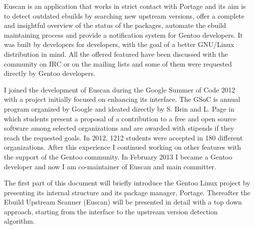 Euscan is an application that works in strict contact with Portage and its aim is to detect outdated ebuilds by searching new upstream versions, offer a complete and insightful overview of the status of the packages, automate the ebuild maintaining process and provide a notification system for Gentoo developers.
It was built by developers for developers, with the goal of a better GNU/Linux distribution in mind. All the offered featured have been discussed with the community on IRC or on the mailing lists and some of them were requested directly by Gentoo developers.

I joined the development of Euscan during the Google Summer of Code 2012 with a project initially focused on enhancing its interface. The GSoC is annual program organized by Google and ideated directly by S. Brin and L. Page in which students present a proposal of a contribution to a free and open source software among selected organizations and are awarded with stipends if they reach the requested goals. In 2012, 1212 students were accepted in 180 different organizations\cite{gsoc2012}.
After this experience I continued working on other features with the support of the Gentoo community. In February 2013 I became a Gentoo developer and now I am co-maintainer of Euscan and main committer.


The first part of this document will briefly introduce the Gentoo Linux project by presenting its internal structure and its package manager, Portage.
Thereafter the Ebuild Upstream Scanner (Euscan) will be presented in detail with a top down approach, starting from the interface to the upstream version detection algorithm.